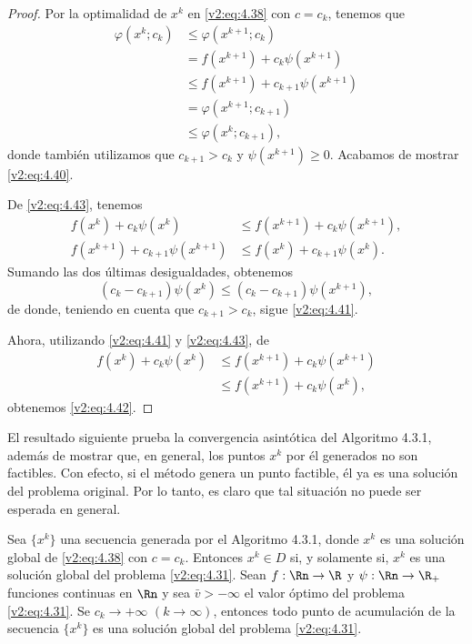 \begin{proof}
    Por la optimalidad de $x^k$ en \eqref{v2:eq:4.38} con $c = c_k$, tenemos que
    \begin{align}
        \varphi(x^k; c_k) &\le \varphi(x^{k+1}; c_k) \nonumber \\
        &= f(x^{k+1}) + c_k\psi(x^{k+1}) \nonumber \\
        &\le f(x^{k+1}) + c_{k+1}\psi(x^{k+1}) \nonumber \\
        &= \varphi(x^{k+1}; c_{k+1}) \nonumber \\
        &\le \varphi(x^k; c_{k+1}), \label{v2:eq:4.43}
    \end{align}
    donde también utilizamos que $c_{k+1} > c_k$ y $\psi(x^{k+1}) \ge 0$. Acabamos de mostrar \eqref{v2:eq:4.40}.
    
    De \eqref{v2:eq:4.43}, tenemos
    \begin{align*}
        f(x^k) + c_k\psi(x^k) &\le f(x^{k+1}) + c_k\psi(x^{k+1}), \\
        f(x^{k+1}) + c_{k+1}\psi(x^{k+1}) &\le f(x^k) + c_{k+1}\psi(x^k).
    \end{align*}
    Sumando las dos últimas desigualdades, obtenemos
    \[
        (c_k - c_{k+1})\psi(x^k) \le (c_k - c_{k+1})\psi(x^{k+1}),
    \]
    de donde, teniendo en cuenta que $c_{k+1} > c_k$, sigue \eqref{v2:eq:4.41}.
    
    Ahora, utilizando \eqref{v2:eq:4.41} y \eqref{v2:eq:4.43}, de
    \begin{align*}
        f(x^k) + c_k\psi(x^k) &\le f(x^{k+1}) + c_k\psi(x^{k+1}) \\
        &\le f(x^{k+1}) + c_k\psi(x^k),
    \end{align*}
    obtenemos \eqref{v2:eq:4.42}.
\end{proof}

El resultado siguiente prueba la convergencia asintótica del Algoritmo 4.3.1, además de mostrar que, en general, los puntos $x^k$ por él generados no son factibles. Con efecto, si el método genera un punto factible, él ya es una solución del problema original. Por lo tanto, es claro que tal situación no puede ser esperada en general.

\begin{theorem}\label{v2:thm:4.3.1}
    Sea $\{x^k\}$ una secuencia generada por el Algoritmo 4.3.1, donde $x^k$ es una solución global de \eqref{v2:eq:4.38} con $c = c_k$.
    Entonces $x^k \in D$ si, y solamente si, $x^k$ es una solución global del problema \eqref{v2:eq:4.31}.
    Sean $f : \Rn \to \R$ y $\psi : \Rn \to \R_+$ funciones continuas en $\Rn$ y sea $\bar{v} > -\infty$ el valor óptimo del problema \eqref{v2:eq:4.31}. Se $c_k \to +\infty$ $(k \to \infty)$, entonces todo punto de acumulación de la secuencia $\{x^k\}$ es una solución global del problema \eqref{v2:eq:4.31}.
\end{theorem}

